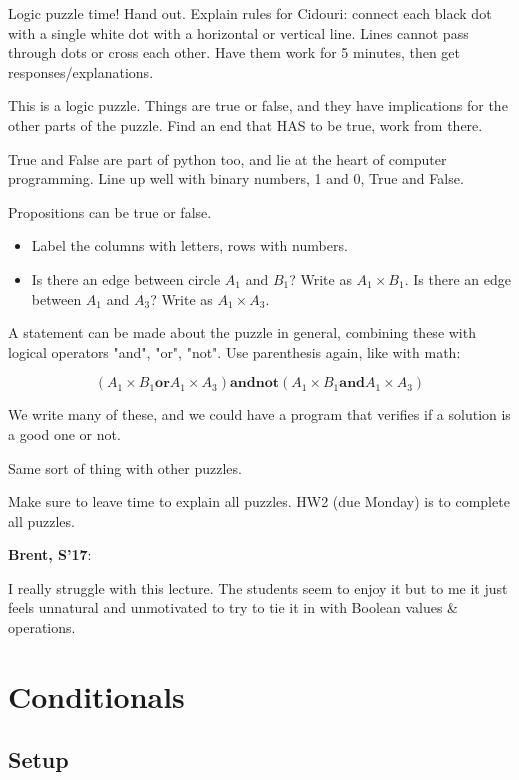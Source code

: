 \documentclass{article}
\newenvironment{reflect}[1]
{
  \noindent
  \begin{lrbox}{\reflectbox}
    \begin{minipage}[t]{\textwidth}
      \textbf{#1}:
}{
    \end{minipage}
  \end{lrbox}
  \fbox{\usebox{\reflectbox}}
}
\begin{document}
Logic puzzle time!  Hand out. Explain rules for Cidouri: connect each
black dot with a single white dot with a horizontal or vertical line.
Lines cannot pass through dots or cross each other.  Have them work
for 5 minutes, then get responses/explanations.

This is a logic puzzle.  Things are true or false, and they have
implications for the other parts of the puzzle.  Find an end that HAS
to be true, work from there.

True and False are part of python too, and lie at the heart of
computer programming.  Line up well with binary numbers, 1 and 0, True
and False.

Propositions can be true or false.
\begin{itemize}
\item Label the columns with letters, rows with numbers.
\item Is there an edge between circle $A_1$ and $B_1$?  Write as $A_1
  \times B_1$. Is there an edge between $A_1$ and $A_3$? Write as $A_1
  \times A_3$.
\end{itemize}
A statement can be made about the puzzle in general, combining these
with logical operators "and", "or", "not".  Use parenthesis again, like
with math:

\newcommand{\orr}{\mathbin{\mathbf{or}}}
\newcommand{\andd}{\mathbin{\mathbf{and}}}
\newcommand{\nott}{\mathbin{\mathbf{not}}}

\[ (A_1 \times B_1 \orr A_1 \times A_3) \andd \nott (A_1 \times B_1 \andd A_1
\times A_3) \]

We write many of these, and we could have a program that verifies if a
solution is a good one or not.

Same sort of thing with other puzzles.

Make sure to leave time to explain all puzzles.  HW2 (due Monday) is
to complete all puzzles.

\begin{reflect}{Brent, S'17}
  I really struggle with this lecture.  The students seem to enjoy it
  but to me it just feels unnatural and unmotivated to try to tie it
  in with Boolean values \& operations.
\end{reflect}

\newpage

\section{Conditionals}

\subsection*{Setup}
\end{document}

